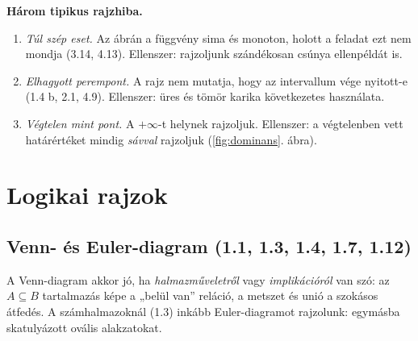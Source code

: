 \documentclass[11pt,a4paper]{article}
\newcommand{\R}{\mathbb{R}}
\newcommand{\N}{\mathbb{N}}
\newcommand{\Z}{\mathbb{Z}}
\newcommand{\Q}{\mathbb{Q}}
\theoremstyle{definition}
\begin{document}
\noindent\textbf{Három tipikus rajzhiba.}
\begin{enumerate}[nosep,leftmargin=*]
  \item \emph{Túl szép eset.} Az ábrán a függvény sima és monoton, holott a feladat
        ezt nem mondja (3.14, 4.13). Ellenszer: rajzoljunk szándékosan csúnya ellenpéldát is.
  \item \emph{Elhagyott perempont.} A rajz nem mutatja, hogy az intervallum vége nyitott-e
        (1.4 b, 2.1, 4.9). Ellenszer: üres és tömör karika következetes használata.
  \item \emph{Végtelen mint pont.} A $+\infty$-t helynek rajzoljuk. Ellenszer: a végtelenben
        vett határértéket mindig \emph{sávval} rajzoljuk (\ref{fig:dominans}. ábra).
\end{enumerate}

\section{Logikai rajzok}

\subsection{Venn- és Euler-diagram (1.1, 1.3, 1.4, 1.7, 1.12)}

A Venn-diagram akkor jó, ha \emph{halmazműveletről} vagy \emph{implikációról} van szó:
az $A \subseteq B$ tartalmazás képe a „belül van” reláció, a metszet és unió a szokásos
átfedés. A számhalmazoknál (1.3) inkább Euler-diagramot rajzolunk: egymásba skatulyázott
ovális alakzatokat.

\begin{center}
\end{center}
\end{document}
